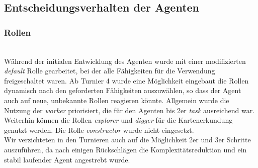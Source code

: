 \subsection{Entscheidungsverhalten der Agenten}

\subsubsection{Rollen} ~\\

Während der initialen Entwicklung des Agenten wurde mit einer modifizierten \textit{default} Rolle gearbeitet, bei der alle Fähigkeiten für die Verwendung freigeschaltet waren. Ab Turnier 4 wurde eine Möglichkeit eingebaut die Rollen dynamisch nach den geforderten Fähigkeiten auszuwählen, so dass der Agent auch auf neue, unbekannte Rollen reagieren könnte. Allgemein wurde die Nutzung der \textit{worker} priorisiert, die für den Agenten bis 2er \textit{task} ausreichend war. Weiterhin können die Rollen  \textit{explorer} und  \textit{digger} für die Kartenerkundung genutzt werden. Die Rolle \textit{constructor} wurde nicht eingesetzt. \\

Wir verzichteten in den Turnieren auch auf die Möglichkeit 2er und 3er Schritte auszuführen, da nach einigen Rückschlägen die Komplexitätsreduktion und ein stabil laufender Agent angestrebt wurde.


